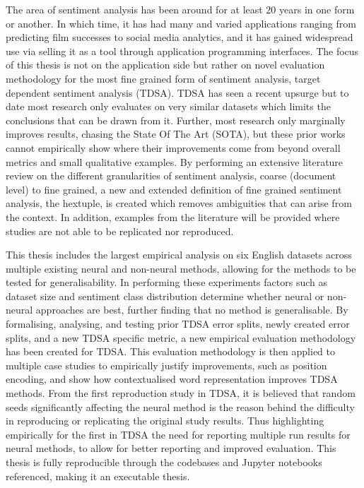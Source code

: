 The area of sentiment analysis has been around for at least 20 years in one form or another. In which time, it has had many and varied applications ranging from predicting film successes to social media analytics, and it has gained widespread use via selling it as a tool through application programming interfaces. The focus of this thesis is not on the application side but rather on novel evaluation methodology for the most fine grained form of sentiment analysis, target dependent sentiment analysis (TDSA). TDSA has seen a recent upsurge but to date most research only evaluates on very similar datasets which limits the conclusions that can be drawn from it. Further, most research only marginally improves results, chasing the State Of The Art (SOTA), but these prior works cannot empirically show where their improvements come from beyond overall metrics and small qualitative examples. By performing an extensive literature review on the different granularities of sentiment analysis, coarse (document level) to fine grained, a new and extended definition of fine grained sentiment analysis, the hextuple, is created which removes ambiguities that can arise from the context. In addition, examples from the literature will be provided where studies are not able to be replicated nor reproduced.

This thesis includes the largest empirical analysis on six English datasets across multiple existing neural and non-neural methods, allowing for the methods to be tested for generalisability. In performing these experiments factors such as dataset size and sentiment class distribution determine whether neural or non-neural approaches are best, further finding that no method is generalisable. By formalising, analysing, and testing prior TDSA error splits, newly created error splits, and a new TDSA specific metric, a new empirical evaluation methodology has been created for TDSA. This evaluation methodology is then applied to multiple case studies to empirically justify improvements, such as position encoding, and show how contextualised word representation improves TDSA methods. From the first reproduction study in TDSA, it is believed that random seeds significantly affecting the neural method is the reason behind the difficulty in reproducing or replicating the original study results. Thus highlighting empirically for the first in TDSA the need for reporting multiple run results for neural methods, to allow for better reporting and improved evaluation. This thesis is fully reproducible through the codebases and Jupyter notebooks referenced, making it an executable thesis.
